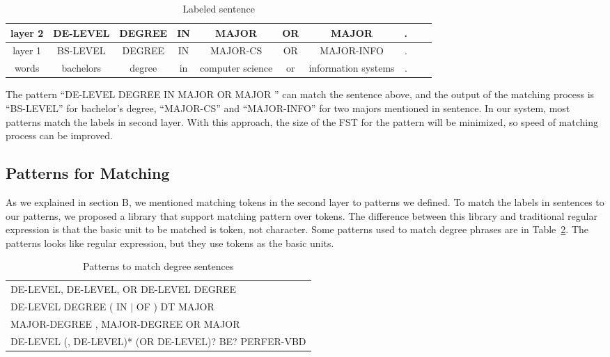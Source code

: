 \begin{table}[ht]
\caption{Labeled sentence } %
\centering %
\small
\begin{tabular}{  | c | c | c | c | c |c | c |c | c | c |  }
 \hline
 layer 2 & DE-LEVEL   & DEGREE & IN & MAJOR            & OR & MAJOR  &.  \\
 \hline
 layer 1 &  BS-LEVEL   & DEGREE & IN & MAJOR-CS         & OR & MAJOR-INFO & .      \\
 \hline
   words & bachelors   & degree & in & computer science & or & information systems & .     \\
  \hline
\end{tabular}
\label{tab:labeldsent} %
\end{table}

The pattern ``DE-LEVEL DEGREE  IN   MAJOR  OR  MAJOR ''  can match the sentence above, and the output of the matching process is ``BS-LEVEL'' for bachelor's degree, ``MAJOR-CS'' and ``MAJOR-INFO'' for two majors mentioned in sentence. In our system, most patterns match the labels in second layer. With this approach, the size of the FST for the pattern will be minimized, so speed of matching process can be improved.


\subsection{Patterns for Matching}
\label{subsec1}

As we explained in section B, we mentioned matching tokens in the second layer to patterns we defined. To match the labels in sentences to our patterns, we proposed a library that support matching pattern over tokens. The difference between this library and traditional regular expression is that the basic unit to be matched is token, not character. Some patterns used to match degree phrases are in Table~\ref{tab:patterns}. The patterns looks like regular expression, but they use tokens as the basic units.

\begin{table}[ht]
\small
\caption{Patterns to match degree sentences} %
\centering %
\begin{tabular}{  | l  |  }
 \hline
 DE-LEVEL,  DE-LEVEL, OR  DE-LEVEL DEGREE   \\
 DE-LEVEL DEGREE ( IN  $\vert$  OF ) DT MAJOR   \\
 MAJOR-DEGREE  ,  MAJOR-DEGREE OR MAJOR \\
 DE-LEVEL (, DE-LEVEL)* (OR DE-LEVEL)? BE? PERFER-VBD   \\
 \hline
\end{tabular}
\label{tab:patterns} %
\end{table}


